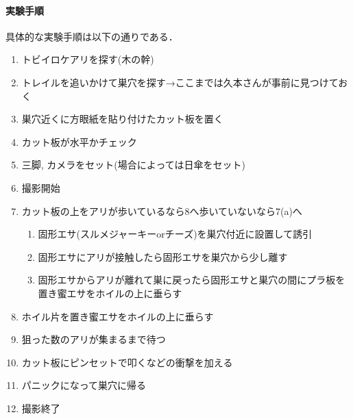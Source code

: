 ﻿\documentclass[a4paper, 12pt]{jsreport}
\begin{document}
\paragraph{実験手順}
具体的な実験手順は以下の通りである．
\begin{enumerate}
   \item トビイロケアリを探す(木の幹)
   \item トレイルを追いかけて巣穴を探す→ここまでは久本さんが事前に見つけておく 
   \item  巣穴近くに方眼紙を貼り付けたカット板を置く
   \item カット板が水平かチェック
   \item 三脚, カメラをセット(場合によっては日傘をセット)
   \item 撮影開始
   \item カット板の上をアリが歩いているなら8へ歩いていないなら7(a)へ
   \begin{enumerate}
     \item 固形エサ(スルメジャーキーorチーズ)を巣穴付近に設置して誘引  
     \item 固形エサにアリが接触したら固形エサを巣穴から少し離す
     \item 固形エサからアリが離れて巣に戻ったら固形エサと巣穴の間にプラ板を置き蜜エサをホイルの上に垂らす
    \end{enumerate}
   \item ホイル片を置き蜜エサをホイルの上に垂らす
   \item 狙った数のアリが集まるまで待つ
   \item カット板にピンセットで叩くなどの衝撃を加える
   \item パニックになって巣穴に帰る
   \item 撮影終了
 \end{enumerate}
\end{document}
